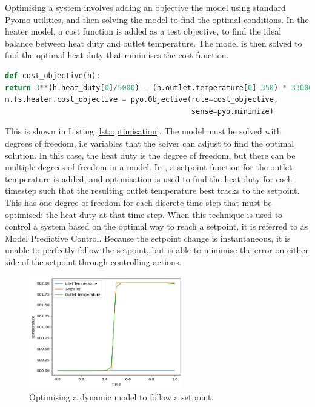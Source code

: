 Optimising a system involves adding an objective the model using standard Pyomo utilities, and then solving the model to find the optimal conditions. In the heater model, a cost function is added as a test objective, to find the ideal balance between heat duty and outlet temperature. The model is then solved to find the optimal heat duty that minimises the cost function.

\begin{lstlisting}[language=Python,caption=Optimising the heater model in IDAES,label=lst:optimisation]
def cost_objective(h):
return 3**(h.heat_duty[0]/5000) - (h.outlet.temperature[0]-350) * 33000
m.fs.heater.cost_objective = pyo.Objective(rule=cost_objective, 
                                           sense=pyo.minimize)
\end{lstlisting}

This is shown in Listing \ref{lst:optimisation}. The model must be solved with degrees of freedom, i.e variables that the solver can adjust to find the optimal solution. In this case, the heat duty is the degree of freedom, but there can be multiple degrees of freedom in a model. 
In , a setpoint function for the outlet temperature is added, and optimisation is used to find the heat duty for each timestep such that the resulting outlet temperature best tracks to the setpoint. This has one degree of freedom for each discrete time step that must be optimised: the heat duty at that time step. 
When this technique is used to control a system based on the optimal way to reach a setpoint, it is referred to as Model Predictive Control.
Because the setpoint change is instantaneous, it is unable to perfectly follow the setpoint, but is able to minimise the error on either side of the setpoint through controlling actions. 

\begin{figure}[h]
    \centering
    \includegraphics[width=0.6\textwidth]{research_article/dynamics_optimisation.png}
    \caption{Optimising a dynamic model to follow a setpoint.}
    \label{fig:optimisation_dynamics}
\end{figure}

